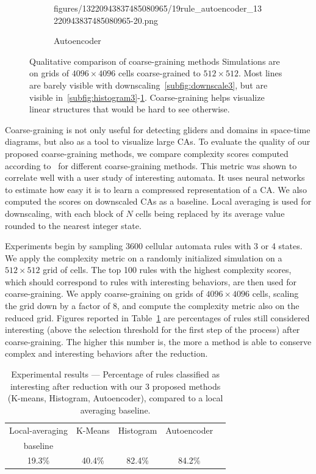 \begin{figure}[th]
\begin{subfigure}{.48\linewidth}
{    {figures/13220943837485080965/19rule_autoencoder_13220943837485080965-20.png}}
    \caption{\label{subfig:autoencoder3}Autoencoder}
  \end{subfigure}
  \caption{ Qualitative comparison of coarse-graining methods Simulations are on
    grids of $4096 \times 4096$ cells coarse-grained to $512 \times 512$. Most lines
    are barely visible with downscaling~\ref{subfig:downscale3}, but are visible
    in~\ref{subfig:histogram3}-\ref{subfig:autoencoder3}. Coarse-graining helps
    visualize linear structures that would be hard to see
    otherwise.\label{fig:qualitative}}
\end{figure}

Coarse-graining is not only useful for detecting gliders and domains in
space-time diagrams, but also as a tool to visualize large CAs. To evaluate the
quality of our proposed coarse-graining methods, we compare complexity scores
computed according to~\parencite{cisnerosEvolvingStructuresComplex2019} for different
coarse-graining methods. This metric was shown to correlate well with a user
study of interesting automata. It uses neural networks to estimate how easy it
is to learn a compressed representation of a CA\@. We also computed the scores on
downscaled CAs as a baseline. Local averaging is used for downscaling, with each
block of $N$ cells being replaced by its average value rounded to the nearest
integer state.

Experiments begin by sampling 3600 cellular automata rules with 3 or 4 states.
We apply the complexity metric on a randomly initialized simulation on a $512
\times 512$ grid of cells. The top 100 rules with the highest complexity scores,
which should correspond to rules with interesting behaviors, are then used for
coarse-graining. We apply coarse-graining on grids of $4096 \times 4096$ cells,
scaling the grid down by a factor of $8$, and compute the complexity metric also
on the reduced grid. Figures reported in Table~\ref{tab:experiments_table_vc} are
percentages of rules still considered interesting (above the selection threshold
for the first step of the process) after coarse-graining. The higher this number
is, the more a method is able to conserve complex and interesting behaviors
after the reduction.

\begin{table}[t!]
  \centering
  \begin{tabular}{ccccc}
    \toprule
       Local-averaging & K-Means & Histogram & Autoencoder\\
     baseline &  & & \\
    \midrule
      19.3\%  & 40.4\% & 82.4\% & 84.2\%\\
    \bottomrule
  \end{tabular}
  \caption{Experimental results --- Percentage of rules classified as
      interesting after reduction with our 3 proposed
      methods (K-means, Histogram, Autoencoder), compared to a local averaging
      baseline.}\label{tab:experiments_table_vc}
\end{table}

